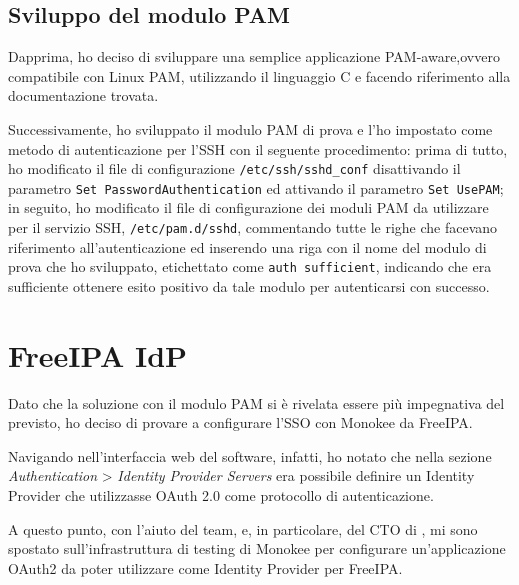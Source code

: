 \subsection{Sviluppo del modulo PAM}
Dapprima, ho deciso di sviluppare una semplice applicazione PAM-aware,ovvero compatibile con Linux PAM, utilizzando il linguaggio C e facendo riferimento alla documentazione trovata.  

Successivamente, ho sviluppato il modulo PAM di prova e l'ho impostato come metodo di autenticazione per l'SSH con il seguente procedimento: prima di tutto, ho modificato il file di configurazione \texttt{/etc/ssh/sshd\_conf} disattivando il parametro \texttt{Set PasswordAuthentication} ed attivando il parametro \texttt{Set UsePAM}; in seguito, ho modificato il file di configurazione dei moduli PAM da utilizzare per il servizio SSH, \texttt{/etc/pam.d/sshd}, commentando tutte le righe che facevano riferimento all'autenticazione ed inserendo una riga con il nome del modulo di prova che ho sviluppato, etichettato come \texttt{auth  sufficient}, indicando che era sufficiente ottenere esito positivo da tale modulo per autenticarsi con successo. 

\section{FreeIPA IdP}

Dato che la soluzione con il modulo PAM si è rivelata essere più impegnativa del previsto, ho deciso di provare a configurare l'SSO con Monokee da FreeIPA. 

Navigando nell'interfaccia web del software, infatti, ho notato che nella sezione \textit{Authentication} > \textit{Identity Provider Servers} era possibile definire un Identity Provider che utilizzasse OAuth 2.0 come protocollo di autenticazione.

A questo punto, con l'aiuto del team, e, in particolare, del CTO di \myAzienda, mi sono spostato sull'infrastruttura di testing di Monokee per configurare un'applicazione OAuth2 da poter utilizzare come Identity Provider per FreeIPA.

